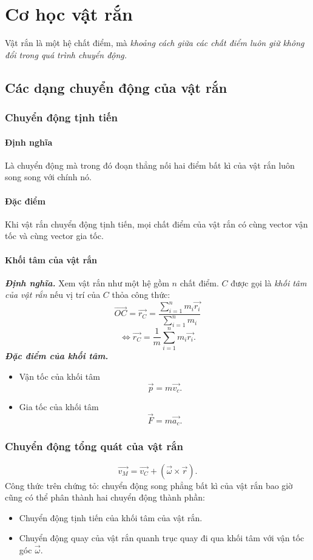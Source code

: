 
\chapter{Cơ học vật rắn}
Vật rắn là một hệ chất điểm, mà \textit{khoảng cách giữa các chất điểm luôn giữ không đổi trong quá trình chuyển động.}
\section{Các dạng chuyển động của vật rắn}
\subsection{Chuyển động tịnh tiến}
\subsubsection{Định nghĩa}
Là chuyển động mà trong đó đoạn thẳng nối hai điểm bất kì của vật rắn luôn song song với chính nó.
\subsubsection{Đặc điểm}
Khi vật rắn chuyển động tịnh tiến, mọi chất điểm của vật rắn có cùng vector vận tốc và cùng vector gia tốc.
\subsubsection{Khối tâm của vật rắn}
\textbf{\textit{Định nghĩa.}} Xem vật rắn như một hệ gồm $n$ chất điểm. $C$ được gọi là \textit{khối tâm của vật rắn} nếu vị trí của $C$ thỏa công thức:
$$\overrightarrow {OC}  = \overrightarrow {{r_C}}  = \frac{{\sum\limits_{i = 1}^n {{m_i}\overrightarrow {{r_i}} } }}{{\sum\limits_{i = 1}^n {{m_i}} }}$$
$$ \Leftrightarrow \overrightarrow {{r_C}}  = \frac{1}{m}\sum\limits_{i = 1}^n {{m_i}\overrightarrow {{r_i}} } .$$
\textbf{\textit{Đặc điểm của khối tâm.}}
\begin{itemize}
\item Vận tốc của khối tâm
$$\overrightarrow{p} = m \overrightarrow{v_c}.$$
\item Gia tốc của khối tâm
$$\overrightarrow{F} = m \overrightarrow{a_c}.$$
\end{itemize}
\subsection{Chuyển động tổng quát của vật rắn}
$$\overrightarrow {{v_M}}  = \overrightarrow {{v_C}}  + \left( {\overrightarrow \omega   \times \overrightarrow r } \right).$$
Công thức trên chứng tỏ: chuyển động song phẳng bất kì của vật rắn bao giờ cũng có thể phân thành hai chuyển động thành phần:
\begin{itemize}
\item Chuyển động tịnh tiến của khối tâm của vật rắn.
\item Chuyển động quay của vật rắn quanh trục quay đi qua khối tâm với vận tốc góc $\overrightarrow{\omega}.$
\end{itemize}
